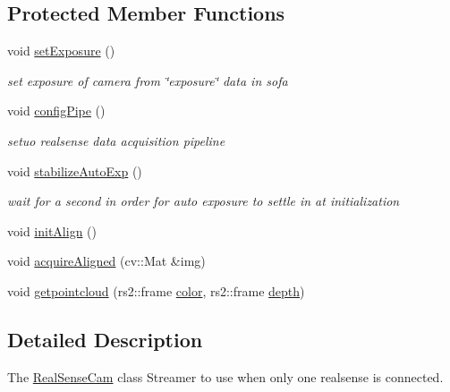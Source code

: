 \subsection*{Protected Member Functions}
\begin{DoxyCompactItemize}
\item 
void \hyperlink{classsofa_1_1rgbdtracking_1_1_real_sense_cam_ad11af2a678cdbe9d4cb69160654ddc59}{set\+Exposure} ()
\begin{DoxyCompactList}\small\item\em set exposure of camera from \char`\"{}exposure\char`\"{} data in sofa \end{DoxyCompactList}\item 
void \hyperlink{classsofa_1_1rgbdtracking_1_1_real_sense_cam_a60647ccc41e670ac3f5d7ad8b5d96194}{config\+Pipe} ()
\begin{DoxyCompactList}\small\item\em setuo realsense data acquisition pipeline \end{DoxyCompactList}\item 
void \hyperlink{classsofa_1_1rgbdtracking_1_1_real_sense_cam_a90411168a51a6899f412391bfae3b7ed}{stabilize\+Auto\+Exp} ()
\begin{DoxyCompactList}\small\item\em wait for a second in order for auto exposure to settle in at initialization \end{DoxyCompactList}\item 
void \hyperlink{classsofa_1_1rgbdtracking_1_1_real_sense_cam_a6825194f2f9395c96f27737c574e517d}{init\+Align} ()
\item 
void \hyperlink{classsofa_1_1rgbdtracking_1_1_real_sense_cam_a29789038ece88a4d6485c0f6d01abe70}{acquire\+Aligned} (cv\+::\+Mat \&img)
\item 
void \hyperlink{classsofa_1_1rgbdtracking_1_1_real_sense_cam_a14c83fdb652f4d40a95a402dd930f7a9}{getpointcloud} (rs2\+::frame \hyperlink{classsofa_1_1rgbdtracking_1_1_real_sense_streamer_ac8353a52ed5997b5180bcc99f384c351}{color}, rs2\+::frame \hyperlink{classsofa_1_1rgbdtracking_1_1_real_sense_streamer_ae5a0ca709953b170ffb596abedd51eed}{depth})
\end{DoxyCompactItemize}


\subsection{Detailed Description}
The \hyperlink{classsofa_1_1rgbdtracking_1_1_real_sense_cam}{Real\+Sense\+Cam} class Streamer to use when only one realsense is connected. 

